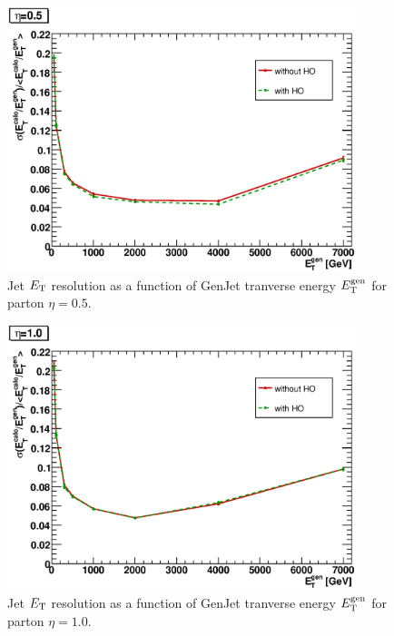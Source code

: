 \documentclass{cmspaper}
\begin{document}
\begin{figure}
 \centering
 \includegraphics[width=4in]{figs/ET_resolution_corr_eta0.5.eps}
 \caption{Jet $E_\text T$ resolution as a function of GenJet tranverse energy $E^\text{gen}_\text T$ for parton $\eta=0.5$.}
 \label{fig:ET_res_05}
\end{figure}

\begin{figure}
 \centering
 \includegraphics[width=4in]{figs/ET_resolution_corr_eta1.0.eps}
 \caption{Jet $E_\text T$ resolution as a function of GenJet tranverse energy $E^\text{gen}_\text T$ for parton $\eta=1.0$.}
 \label{fig:ET_res_10}
\end{figure}
\end{document}
